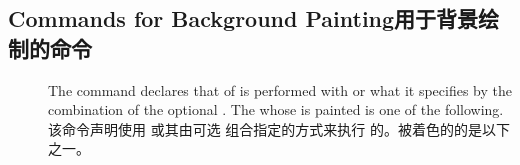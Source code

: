 
\subsection{Commands for Background Painting\hfill 用于背景绘制的命令}
\label{sec:ref-bgpaint}

\begin{description}
\item[\Midx{\!\backgroundcolor!}]
    \mbox{}\par
{}
    \mbox{}\par
{}
    \mbox{}\par
{}
\begin{paracol}{2}
The command declares that {\em\Uidx\bgpaint} of  is performed
with  or what it specifies by the combination of the optional
.  The  whose \bground{} is painted is one of the
following.
\switchcolumn
该命令声明使用  或其由可选  组合指定的方式来执行  的{\em\Uidx\bgpaint}。被着色的\bground{}的是以下之一。
\end{paracol}



\end{description}
